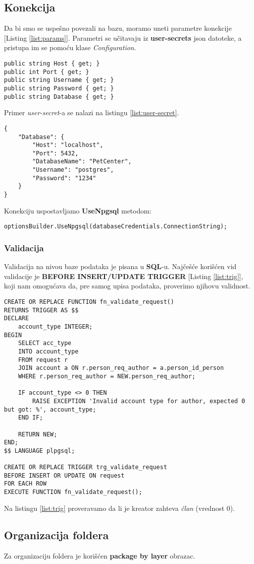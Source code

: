 \subsection*{Konekcija}
\par Da bi smo se uspešno povezali na bazu, moramo uneti parametre konekcije [Listing \ref{list:params}]. Parametri se učitavaju iz
\textbf{user-secrets} json datoteke, a pristupa im se pomoću klase \textit{Configuration}.
\begin{lstlisting}[caption={Parametri konekcije}, captionpos=b, label={list:params}]
public string Host { get; }
public int Port { get; }
public string Username { get; }
public string Password { get; }
public string Database { get; }
\end{lstlisting}
\par Primer \textit{user-secret}-a se nalazi na listingu \ref{list:user-secret}.
\begin{lstlisting}[caption={Primer \textit{user-secret}}, captionpos=b, label={list:user-secret}]
{
    "Database": {
        "Host": "localhost",
        "Port": 5432,
        "DatabaseName": "PetCenter",
        "Username": "postgres",
        "Password": "1234"
    }
}
\end{lstlisting}
\par Konekciju uspostavljamo \textbf{UseNpgsql} metodom:
\begin{lstlisting}[caption={Uspostavljanje konekcije}, captionpos=b]
optionsBuilder.UseNpgsql(databaseCredentials.ConnectionString);
\end{lstlisting}
\subsubsection*{Validacija}
\par Validacija na nivou baze podataka je pisana u \textbf{SQL}-u. Najčešće korišćen
vid validacije je \textbf{BEFORE INSERT/UPDATE TRIGGER} [Listing \ref{list:trig}], koji nam omogućava da, pre samog upisa podataka, proverimo njihovu validnost.
\begin{lstlisting}[caption={Primer validacije pomoću trigera}, captionpos=b, label=list:trig]
CREATE OR REPLACE FUNCTION fn_validate_request()
RETURNS TRIGGER AS $$
DECLARE
	account_type INTEGER;
BEGIN
	SELECT acc_type
	INTO account_type
	FROM request r
	JOIN account a ON r.person_req_author = a.person_id_person
	WHERE r.person_req_author = NEW.person_req_author;

	IF account_type <> 0 THEN
		RAISE EXCEPTION 'Invalid account type for author, expected 0 but got: %', account_type;
	END IF;

	RETURN NEW;
END;
$$ LANGUAGE plpgsql;

CREATE OR REPLACE TRIGGER trg_validate_request
BEFORE INSERT OR UPDATE ON request
FOR EACH ROW
EXECUTE FUNCTION fn_validate_request();
\end{lstlisting}
\par Na listingu \ref{list:trig} proveravamo da li je kreator zahteva \textit{član} (vrednost 0).
\subsection{Organizacija foldera}
\par Za organizaciju foldera je korišćen \textbf{package by layer} obrazac.